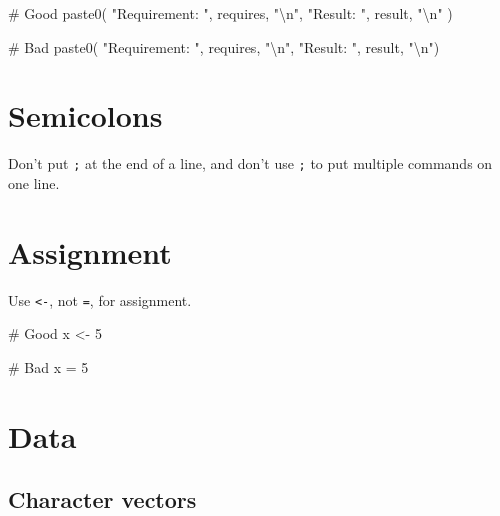 \documentclass[twoside, pagesize, fontsize=11pt, dvipsnames]{scrreport} %
\newenvironment{Shaded}{\begin{snugshade}}{\end{snugshade}}
\newcommand{\CommentTok}[1]{\textcolor[rgb]{0.37,0.37,0.37}{#1}}
\newcommand{\DecValTok}[1]{\textcolor[rgb]{0.68,0.00,0.00}{#1}}
\newcommand{\FunctionTok}[1]{\textcolor[rgb]{0.28,0.35,0.67}{#1}}
\newcommand{\NormalTok}[1]{\textcolor[rgb]{0.00,0.23,0.31}{#1}}
\newcommand{\OtherTok}[1]{\textcolor[rgb]{0.00,0.23,0.31}{#1}}
\newcommand{\SpecialCharTok}[1]{\textcolor[rgb]{0.37,0.37,0.37}{#1}}
\newcommand{\StringTok}[1]{\textcolor[rgb]{0.13,0.47,0.30}{#1}}
\begin{document}
\begin{Shaded}
\begin{Highlighting}[]
\CommentTok{\# Good}
\FunctionTok{paste0}\NormalTok{(}
  \StringTok{"Requirement: "}\NormalTok{, requires, }\StringTok{"}\SpecialCharTok{\textbackslash{}n}\StringTok{"}\NormalTok{,}
  \StringTok{"Result: "}\NormalTok{, result, }\StringTok{"}\SpecialCharTok{\textbackslash{}n}\StringTok{"}
\NormalTok{)}

\CommentTok{\# Bad}
\FunctionTok{paste0}\NormalTok{(}
  \StringTok{"Requirement: "}\NormalTok{, requires,}
  \StringTok{"}\SpecialCharTok{\textbackslash{}n}\StringTok{"}\NormalTok{, }\StringTok{"Result: "}\NormalTok{,}
\NormalTok{  result, }\StringTok{"}\SpecialCharTok{\textbackslash{}n}\StringTok{"}\NormalTok{)}
\end{Highlighting}
\end{Shaded}

\hypertarget{semicolons}{%
\section{Semicolons}\label{semicolons}}

Don't put \texttt{;} at the end of a line, and don't use \texttt{;} to
put multiple commands on one line.

\hypertarget{assignment-1}{%
\section{Assignment}\label{assignment-1}}

Use \texttt{\textless{}-}, not \texttt{=}, for assignment.

\begin{Shaded}
\begin{Highlighting}[]
\CommentTok{\# Good}
\NormalTok{x }\OtherTok{\textless{}{-}} \DecValTok{5}

\CommentTok{\# Bad}
\NormalTok{x }\OtherTok{=} \DecValTok{5}
\end{Highlighting}
\end{Shaded}

\hypertarget{data}{%
\section{Data}\label{data}}

\hypertarget{character-vectors}{%
\subsection{Character vectors}\label{character-vectors}}
\end{document}
